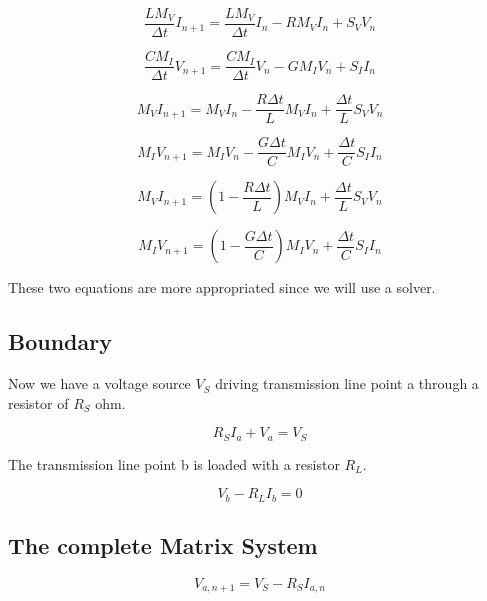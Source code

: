 \documentclass[12pt, letterpaper]{article}
\begin{document}
\begin{equation}
	\frac{L M_V}{\Delta t} I_{n+1} = \frac{L M_V}{\Delta t} I_n - R M_V I_n + S_V V_n
\end{equation}

\begin{equation}
	\frac{C M_I}{\Delta t} V_{n+1}
	= \frac{C M_I}{\Delta t} V_n - G M_I V_n + S_I I_n 
\end{equation}

\begin{equation}
	M_V I_{n+1} = M_V I_n - \frac{R \Delta t}{L} M_V I_n + \frac{\Delta t}{L} S_V V_n
\end{equation}

\begin{equation}
	M_I V_{n+1}
	= M_I V_n - \frac{G \Delta t}{C} M_I V_n + \frac{\Delta t}{C} S_I I_n 
\end{equation}


\begin{equation}
	M_V I_{n+1} = (1 - \frac{R \Delta t}{L}) M_V I_n + \frac{\Delta t}{L} S_V V_n
\end{equation}

\begin{equation}
	M_I V_{n+1}
	= (1 - \frac{G \Delta t}{C}) M_I V_n + \frac{\Delta t}{C} S_I I_n 
\end{equation}

These two equations are more appropriated since we will use a solver.

\subsection{Boundary}
Now we have a voltage source $V_S$ driving transmission line point a through a resistor of $R_S$ ohm.

\begin{equation}
	R_S I_a + V_a = V_S
\end{equation}

The transmission line point b is loaded with a resistor $R_L$.

\begin{equation}
	V_b - R_L I_b = 0
\end{equation}


\subsection{The complete Matrix System}


\begin{equation}
	V_{a,n+1} = V_S - R_S I_{a,n}
\end{equation}
\end{document}
